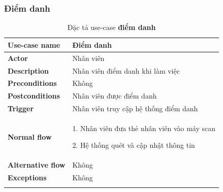         \subsubsection{Điểm danh}
        {
\setlength\extrarowheight{6pt}
            \begin{longtable}{| p{} | p{} |} 
                \hline
                    \textbf{Use-case name} 
                & 
                    Điểm danh
                \\
                \hline
                    \textbf{Actor} 
                & 
                    Nhân viên
                \\
                \hline
                    \textbf{Description} 
                & 
                    Nhân viên điểm danh khi làm việc
                \\
                \hline
                    \textbf{Preconditions} 
                &
                    Không
                \\
                \hline
                    \textbf{Postconditions} 
                & 
                    Nhân viên được điểm danh
                \\
                \hline
                    \textbf{Trigger} 
                & 
                    Nhân viên truy cập hệ thống điểm danh
                \\
                \hline
                    \textbf{Normal flow}
                & 
                1. Nhân viên đưa thẻ nhân viên vào máy scan
                    
                    2. Hệ thống quét và cập nhật thông tin
                \\
                \hline
                    \textbf{Alternative flow}
                &
                    Không
                \\
                \hline
                    \textbf{Exceptions} 
                &
                    Không
                \\
                \hline
                \caption{Đặc tả use-case \textbf{điểm danh}}
            \end{longtable}
        }

